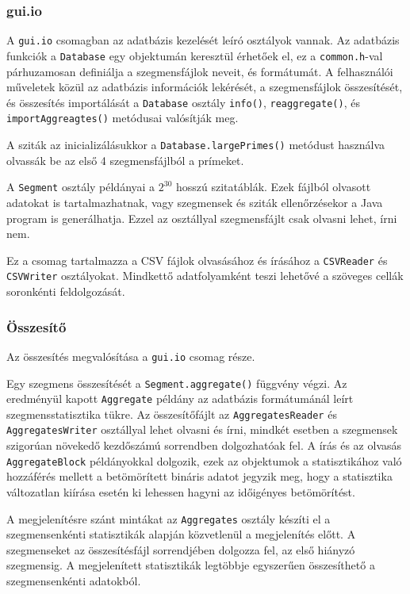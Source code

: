 \subsubsection{gui.io}

A \texttt{gui.io} csomagban az adatbázis kezelését leíró osztályok vannak.
Az adatbázis funkciók a \texttt{Database} egy objektumán keresztül érhetőek el, ez a \texttt{common.h}-val párhuzamosan definiálja a szegmensfájlok neveit, és formátumát.
A felhasználói műveletek közül az adatbázis információk lekérését, a szegmensfájlok összesítését, és összesítés importálását a \texttt{Database} osztály \texttt{info()}, \texttt{reaggregate()}, és \texttt{importAggreagtes()} metódusai valósítják meg.

A sziták az inicializálásukkor a \texttt{Database.largePrimes()} metódust használva olvassák be az első 4 szegmensfájlból a prímeket.

A \texttt{Segment} osztály példányai a $2^{30}$ hosszú szitatáblák.
Ezek fájlból olvasott adatokat is tartalmazhatnak, vagy szegmensek és sziták ellenőrzésekor a Java program is generálhatja.
Ezzel az osztállyal szegmensfájlt csak olvasni lehet, írni nem.

Ez a csomag tartalmazza a CSV fájlok olvasásához és írásához a \texttt{CSVReader} és \texttt{CSVWriter} osztályokat.
Mindkettő adatfolyamként teszi lehetővé a szöveges cellák soronkénti feldolgozását.

\subsubsection{Összesítő}

Az összesítés megvalósítása a \texttt{gui.io} csomag része.

Egy szegmens összesítését a \texttt{Segment.aggregate()} függvény végzi.
Az eredményül kapott \texttt{Aggregate} példány az adatbázis formátumánál leírt szegmensstatisztika tükre.
Az összesítőfájlt az \texttt{AggregatesReader} és \texttt{AggregatesWriter} osztállyal lehet olvasni és írni, mindkét esetben a szegmensek szigorúan növekedő kezdőszámú sorrendben dolgozhatóak fel.
A írás és az olvasás \texttt{AggregateBlock} példányokkal dolgozik, ezek az objektumok a statisztikához való hozzáférés mellett a betömörített bináris adatot jegyzik meg, hogy a statisztika változatlan kiírása esetén ki lehessen hagyni az időigényes betömörítést.

A megjelenítésre szánt mintákat az \texttt{Aggregates} osztály készíti el a szegmensenkénti statisztikák alapján közvetlenül a megjelenítés előtt.
A szegmenseket az összesítésfájl sorrendjében dolgozza fel, az első hiányzó szegmensig.
A megjelenített statisztikák legtöbbje egyszerűen összesíthető a szegmensenkénti adatokból.

